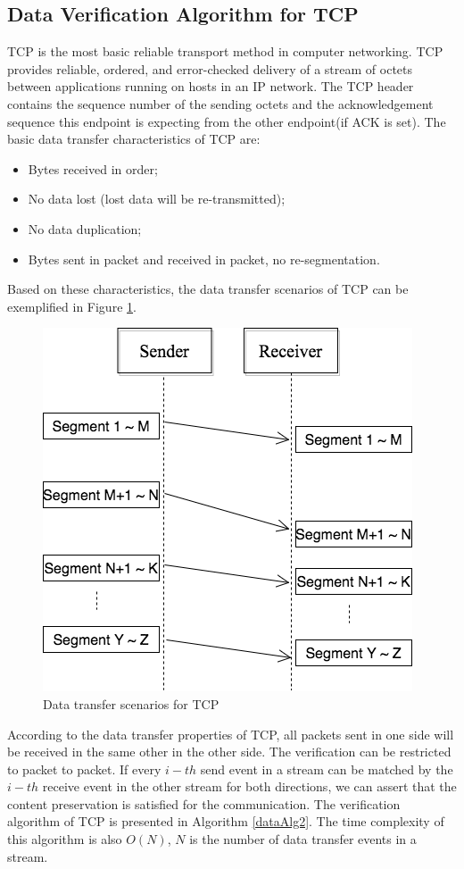 \subsection{Data Verification Algorithm for TCP}
TCP is the most basic reliable transport method in computer networking. TCP provides reliable, ordered, and error-checked delivery of a stream of octets between applications running on hosts in an IP network. The TCP header contains the sequence number of the sending octets and the acknowledgement sequence this endpoint is expecting from the other endpoint(if ACK is set). The basic data transfer characteristics of TCP are:
\begin{itemize}
  \item Bytes received in order;
  \item No data lost (lost data will be re-transmitted);
  \item No data duplication;
  \item Bytes sent in packet and received in packet, no re-segmentation.
\end{itemize}

Based on these characteristics,  the data transfer scenarios of TCP can be exemplified in Figure \ref{tcp}.

\begin{figure}[H]
\centerline{\includegraphics[scale=0.4]{Figures/tcp}}
 \caption{Data transfer scenarios for TCP}
\label{tcp}
\end{figure}

According to the data transfer properties of TCP, all packets sent in one side will be received in the same other in the other side. The verification can be restricted to packet to packet. If every $i-th$ send event in a stream can be matched by the $i-th$ receive event in the other stream for both directions, we can assert that the content preservation is satisfied for the communication. The verification algorithm of TCP is presented in Algorithm \ref{dataAlg2}. The time complexity of this algorithm is also $O(N)$, $N$ is the number of data transfer events in a stream.

